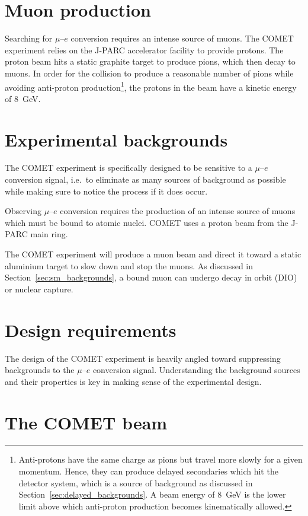 \section{Muon production}
Searching for $\mu$--$e$ conversion requires an intense source of muons. The
COMET experiment relies on the J-PARC accelerator facility to provide protons.
The proton beam hits a static graphite target to produce pions, which then decay
to muons. In order for the collision to produce a reasonable number of pions
while avoiding anti-proton production\footnote{
Anti-protons have the same charge as pions but travel more slowly for a given
momentum. Hence, they can produce delayed secondaries which hit the detector
system, which is a source of background as discussed in
Section~\ref{sec:delayed_backgrounds}. A beam energy of \SI{8}{\GeV} is the
lower limit above which anti-proton production becomes kinematically allowed.
}, the protons in the beam have a kinetic energy of \SI{8}{\GeV}. 


\section{Experimental backgrounds}\label{sec:backgrounds}
The COMET experiment is specifically designed to be sensitive to a $\mu$--$e$
conversion signal, i.e.\ to eliminate as many sources of background as possible
while making sure to notice the process if it does occur. 

Observing $\mu$--$e$ conversion requires the production of an intense source of
muons which must be bound to atomic nuclei. COMET uses a proton beam from the
J-PARC main ring.


The COMET experiment will produce a
muon beam and direct it toward a static aluminium target to slow down and stop
the muons. As discussed in Section~\ref{sec:sm_backgrounds}, a bound muon can
undergo decay in orbit (DIO) or nuclear capture. 

\section{Design requirements}

The design of the COMET experiment is heavily angled toward suppressing
backgrounds to the $\mu$--$e$ conversion signal. Understanding the background
sources and their properties is key in making sense of the experimental design.

\section{The COMET beam}\label{sec:COMET_beam}


